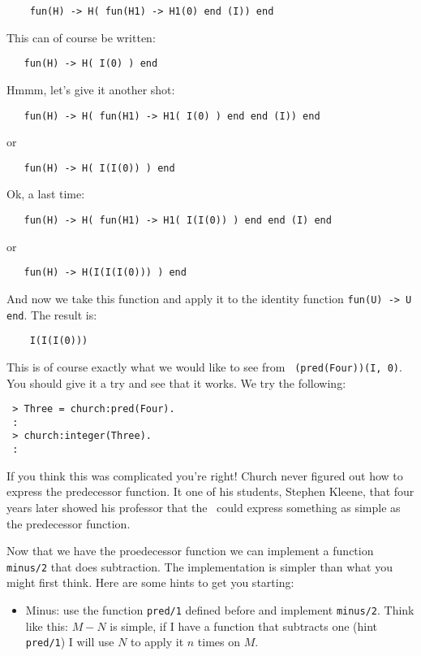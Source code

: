 \documentclass[a4paper,11pt]{article}
\begin{document}
\begin{verbatim}
    fun(H) -> H( fun(H1) -> H1(0) end (I)) end 
\end{verbatim}

This can of course be written:
  
\begin{verbatim}
   fun(H) -> H( I(0) ) end     
\end{verbatim}
 
Hmmm, let's give it another shot:

\begin{verbatim}
   fun(H) -> H( fun(H1) -> H1( I(0) ) end end (I)) end 
\end{verbatim}
or
\begin{verbatim}  
   fun(H) -> H( I(I(0)) ) end 
\end{verbatim}

Ok, a last time:
\begin{verbatim}
   fun(H) -> H( fun(H1) -> H1( I(I(0)) ) end end (I) end 
\end{verbatim}
or
\begin{verbatim}  
   fun(H) -> H(I(I(I(0))) ) end 
\end{verbatim}

And now we take this function and apply it to the identity function
{\tt fun(U) -> U end}. The result is:

\begin{verbatim}
    I(I(I(0)))
\end{verbatim}

This is of course exactly what we would like to see from {\tt
  (pred(Four))(I, 0)}. You should give it a try and see that it works. We 
try the following:

\begin{verbatim}
 > Three = church:pred(Four).
 :
 > church:integer(Three).
 :
\end{verbatim}

If you think this was complicated you're right! Church never figured
out how to express the predecessor function. It one of his students,
Stephen Kleene, that four years later showed his professor that the
\lamc\ could express something as simple as the predecessor function. 

Now that we have the proedecessor function we can implement a function
{\tt minus/2} that does subtraction. The implementation is simpler
than what you might first think. Here are some hints to get you starting:


\begin{itemize}
\item Minus: use the function {\tt pred/1} defined before and
  implement {\tt minus/2}. Think like this: $M - N$ is simple, if I
  have a function that subtracts one (hint {\tt pred/1}) I will use
    $N$ to apply it $n$ times on $M$. 
\end{itemize}
\end{document}
